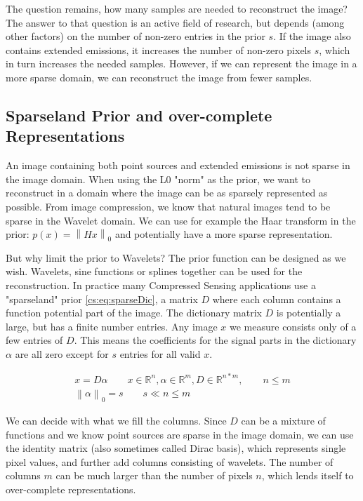 The question remains, how many samples are needed to reconstruct the image? The answer to that question is an active field of research\cite{candes2011probabilistic}, but depends (among other factors) on the number of non-zero entries in the prior $s$. If the image also contains extended emissions, it increases the number of non-zero pixels $s$, which in turn increases the needed samples. However, if we can represent the image in a more sparse domain, we can reconstruct the image from fewer samples.


\subsection{Sparseland Prior and over-complete Representations}
An image containing both point sources and extended emissions is not sparse in the image domain. When using the L0 "norm" as the prior, we want to reconstruct in a domain where the image can be as sparsely represented as possible. From image compression, we know that natural images tend to be sparse in the Wavelet domain. We can use for example the Haar transform in the prior: $p(x) = \left \| Hx \right \|_0$ and potentially have a more sparse representation.

But why limit the prior to Wavelets? The prior function can be designed as we wish. Wavelets, sine functions or splines together can be used for the reconstruction. In practice many Compressed Sensing applications use a "sparseland" prior \eqref{cs:eq:sparseDic}, a matrix $D$ where each column contains a function potential part of the image. The dictionary matrix $D$ is potentially a large, but has a finite number entries. Any image $x$ we measure consists only of a few entries of $D$. This means the coefficients for the signal parts in the dictionary $\alpha$ are all zero except for $s$ entries for all valid $x$.

\begin{equation} \label{cs:eq:sparseDic}
\begin{split}
x = D \alpha  \qquad  x \in \mathbb{R}^{n}, \alpha \in \mathbb{R}^{m}, D \in \mathbb{R}^{n*m}, \qquad n \leq m \\
\left \| \alpha \right \|_0 = s \qquad s \ll n \leq m
\end{split}
\end{equation}

We can decide with what we fill the columns. Since $D$ can be a mixture of functions and we know point sources are sparse in the image domain, we can use the identity matrix (also sometimes called Dirac basis), which represents single pixel values, and further add columns consisting of wavelets. The number of columns $m$ can be much larger than the number of pixels $n$, which lends itself to over-complete representations.

